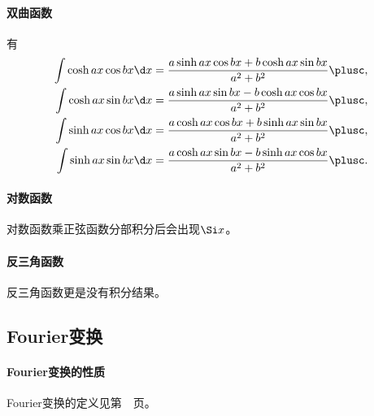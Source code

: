 \paragraph{双曲函数}
有
\begin{align*}
	\int\cosh ax\cos bx\d x=\frac{a\sinh ax\cos bx+b\cosh ax\sin bx}{a^2+b^2}\plusc,\\
	\int\cosh ax\sin bx\d x=\frac{a\sinh ax\sin bx-b\cosh ax\cos bx}{a^2+b^2}\plusc,\\
	\int\sinh ax\cos bx\d x=\frac{a\cosh ax\cos bx+b\sinh ax\sin bx}{a^2+b^2}\plusc,\\
	\int\sinh ax\sin bx\d x=\frac{a\cosh ax\sin bx-b\sinh ax\cos bx}{a^2+b^2}\plusc.
\end{align*}

\paragraph{对数函数}
对数函数乘正弦函数分部积分后会出现$\Si x$。

\paragraph{反三角函数}
反三角函数更是没有积分结果。

\subsection{Fourier变换}

\paragraph{Fourier变换的性质}
\label{The Property of Fourier Transformation}
Fourier变换的定义见第~\pageref{dfn:Integral Transformation}~页。

